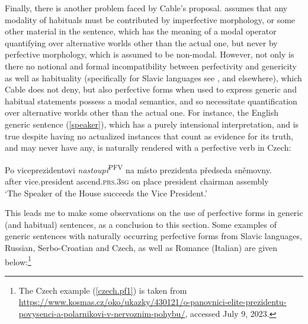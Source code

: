 \documentclass[output=paper,colorlinks,citecolor=brown]{langscibook}
\begin{document}
Finally, there is another problem faced by Cable's proposal. \citet{cable2022} assumes
that any modality of habituals must be contributed by imperfective morphology, or some other material in the sentence, which has the meaning of a modal operator quantifying over alternative worlds other than the actual one, but never by perfective morphology, which is assumed to be non-modal. However, not only is there no notional and formal incompatibility between perfectivity and genericity as well as habituality (specifically for Slavic languages see \citealt{filip1993berkeleyva, filip1994mitva, filip1997suigenva}, and elsewhere), which Cable does not deny, but also perfective forms when used to
express generic and habitual statements possess a modal semantics, and so necessitate quantification over alternative worlds other than the actual one. For instance, the English generic sentence (\ref{speaker}),
which has a purely intensional interpretation,
and is true despite having no actualized instances that count as evidence for its truth, and may never have any, is
naturally rendered with a perfective verb in Czech:

\ea \label{speaker.Czech}
\gll Po viceprezidentovi \textit{nastoupí}\textsuperscript{PFV} na místo prezidenta předseda sněmovny.\\
after vice.president ascend.\textsc{prs.3sg} on place president chairman assembly\\
\glt `The Speaker of the House succeeds the Vice President.'
\z

\noindent This leads me to make some observations on the use of perfective forms in generic (and habitual) sentences,
as a conclusion to this section.
Some examples of generic sentences with naturally occurring
perfective forms from Slavic languages, Russian, Serbo-Croatian and Czech,
as well as Romance (Italian) are given below:\footnote{The Czech example (\ref{czech.pf1}) is taken from \url{https://www.kosmas.cz/oko/ukazky/430121/o-panovnici-elite-prezidentu-povysenci-a-polarnikovi-v-nervoznim-pohybu/}, accessed July 9, 2023.}
\end{document}
